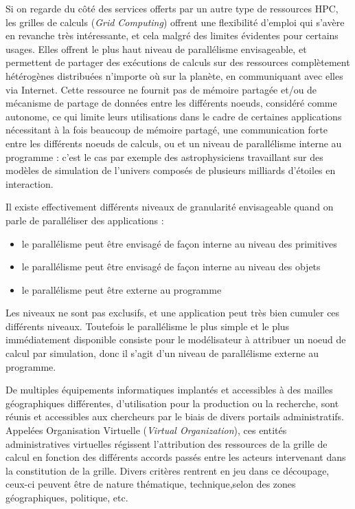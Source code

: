 Si on regarde du côté des services offerts par un autre type de ressources HPC, les grilles de calculs (\textit{Grid Computing}) offrent une flexibilité d'emploi qui s'avère en revanche très intéressante, et cela malgré des limites évidentes pour certains usages.
Elles offrent le plus haut niveau de parallélisme envisageable, et permettent de partager des exécutions de calculs sur des ressources complètement hétérogènes distribuées n'importe où sur la planète, en communiquant avec elles via Internet. Cette ressource ne fournit pas de mémoire partagée et/ou de mécanisme de partage de données entre les différents noeuds, considéré comme autonome, ce qui limite leurs utilisations dans le cadre de certaines applications nécessitant à la fois beaucoup de mémoire partagé, une communication forte entre les différents noeuds de calculs, ou et un niveau de parallélisme interne au programme : c'est le cas par exemple des astrophysiciens travaillant sur des modèles de simulation de l'univers composés de plusieurs milliards d'étoiles en interaction.

Il existe effectivement différents niveaux de granularité envisageable quand on parle de paralléliser des applications :
\begin{itemize}[label=\textbullet]
\item le parallélisme peut être envisagé de façon interne au niveau des primitives
\item le parallélisme peut être envisagé de façon interne au niveau des objets
\item le parallélisme peut être externe au programme
\end{itemize}

Les niveaux ne sont pas exclusifs, et une application peut très bien cumuler ces différents niveaux. Toutefois le parallélisme le plus simple et le plus immédiatement disponible consiste pour le modélisateur à attribuer un noeud de calcul par simulation, donc il s'agit d'un niveau de parallélisme externe au programme.

De multiples équipements informatiques implantés et accessibles à des mailles géographiques différentes, d'utilisation pour la production ou la recherche, sont réunis et accessibles aux chercheurs par le biais de divers portails administratifs. Appelées Organisation Virtuelle (\textit{Virtual Organization}), ces entités administratives virtuelles régissent l'attribution des ressources de la grille de calcul en fonction des différents accords passés entre les acteurs intervenant dans la constitution de la grille. Divers critères rentrent en jeu dans ce découpage, ceux-ci peuvent être de nature thématique, technique,selon des zones géographiques, politique, etc.

